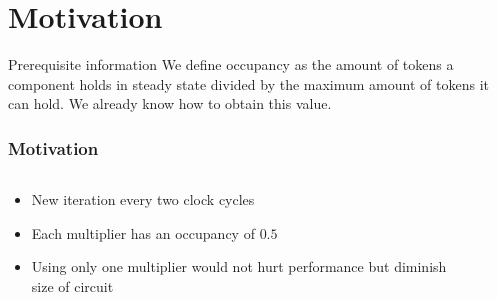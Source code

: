 \documentclass{beamer}
\begin{document}
\section{Motivation}
\begin{frame}{Prerequisite information}
    We define occupancy as the amount of tokens a component holds in steady state divided by the maximum amount of tokens it can hold. We already know how to obtain this value.\footnotemark
    
\end{frame}
\begin{frame}[fragile]
\frametitle{Motivation}
\begin{columns}[T]
    \begin{column}{0.45\textwidth}
 \newline
      \begin{itemize}
          \item New iteration every two clock cycles
          \item Each multiplier has an occupancy of $0.5$
          \item Using only one multiplier would not hurt performance but diminish size of circuit
      \end{itemize}
    \end{column}
    \begin{column}{0.1\textwidth}
    \end{column}
    \begin{column}{0.45\textwidth}

\end{column}
\end{columns}
\end{frame}
\end{document}
